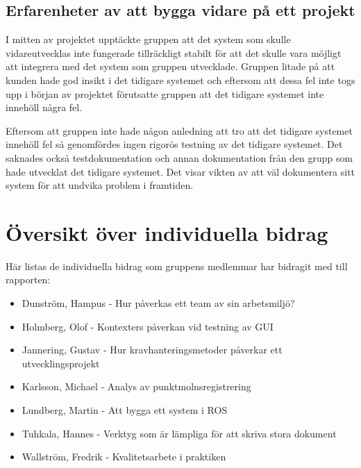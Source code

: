 \subsection{Erfarenheter av att bygga vidare på ett projekt}

I mitten av projektet upptäckte gruppen att det system som skulle vidareutvecklas inte fungerade tillräckligt stabilt för att det skulle vara möjligt att integrera med det system som gruppen utvecklade. Gruppen litade på att kunden hade god insikt i det tidigare systemet och eftersom att dessa fel inte togs upp i början av projektet förutsatte gruppen att det tidigare systemet inte innehöll några fel.

Eftersom att gruppen inte hade någon anledning att tro att det tidigare systemet innehöll fel så genomfördes ingen rigorös testning av det tidigare systemet. Det saknades också testdokumentation och  annan dokumentation från den grupp som hade utvecklat det tidigare systemet. Det visar vikten av att väl dokumentera sitt system för att undvika problem i framtiden.


\section{Översikt över individuella bidrag}

Här listas de individuella bidrag som gruppens medlemmar har bidragit med till rapporten:

\begin{itemize}
	\item Dunström, Hampus - Hur påverkas ett team av sin arbetsmiljö?
	\item Holmberg, Olof - Kontexters påverkan vid testning av GUI
	\item Jannering, Gustav - Hur kravhanteringsmetoder påverkar ett utvecklingsprojekt
	\item Karlsson, Michael - Analys av punktmolnsregistrering
	\item Lundberg, Martin - Att bygga ett system i ROS
	\item Tuhkala, Hannes - Verktyg som är lämpliga för att skriva stora dokument
	\item Wallström, Fredrik - Kvalitetsarbete i praktiken
\end{itemize}


